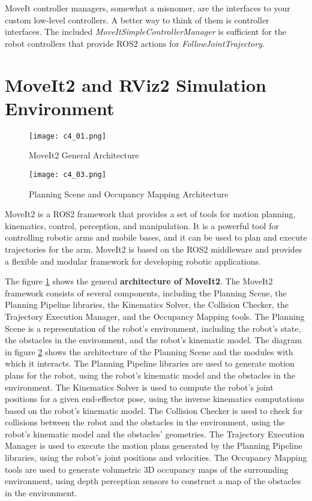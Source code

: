 MoveIt controller managers, somewhat a misnomer, are the interfaces to your custom low-level controllers. 
A better way to think of them is controller interfaces. The included \textit{MoveItSimpleControllerManager} is sufficient
for the robot controllers that provide ROS2 actions for \textit{FollowJointTrajectory}.

\section{MoveIt2 and RViz2 Simulation Environment}

\begin{figure}[t]
    \centering
    \texttt{[image: c4\_01.png]}
    \caption{MoveIt2 General Architecture}
    \label{fig:moveit2}
\end{figure}

\begin{figure}[t]
    \centering
    \texttt{[image: c4\_03.png]}
    \caption{Planning Scene and Occupancy Mapping Architecture}
    \label{fig:planninscence}
\end{figure}


MoveIt2 is a ROS2 framework that provides a set of tools for motion planning, kinematics, control, perception, and
manipulation. It is a powerful tool for controlling robotic arms and mobile bases, and it can be used to plan and
execute trajectories for the arm. MoveIt2 is based on the ROS2 middleware and provides a flexible and modular
framework for developing robotic applications.

The figure \ref{fig:moveit2} shows the general \textbf{architecture of MoveIt2}. The MoveIt2 framework consists of several
components, including the Planning Scene, the Planning Pipeline libraries, the Kinematics Solver, the Collision
Checker, the Trajectory Execution Manager, and the Occupancy Mapping tools.
The Planning Scene is a representation of the robot's environment, including the robot's state, the obstacles in the
environment, and the robot's kinematic model. The diagram in figure \ref{fig:planninscence} shows the architecture
of the Planning Scene and the modules with which it interacts.
The Planning Pipeline libraries are used to generate motion plans
for the robot, using the robot's kinematic model and the obstacles in the environment. The Kinematics Solver is
used to compute the robot's joint positions for a given end-effector pose, using the inverse kinematics
computations based on the robot's kinematic model. The Collision Checker is used to check for collisions between
the robot and the obstacles in the environment, using the robot's kinematic model and the obstacles' geometries.
The Trajectory Execution Manager is used to execute the motion plans generated by the Planning Pipeline libraries,
using the robot's joint positions and velocities. The Occupancy Mapping tools are used to generate volumetric 3D 
occupancy maps of the surrounding environment, using depth perception sensors to construct a map
of the obstacles in the environment. 


